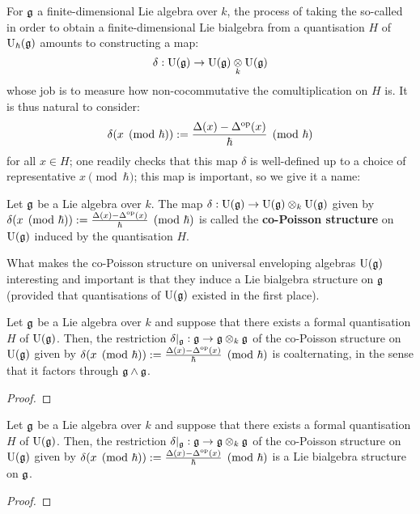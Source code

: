         For $\mathfrak{g}$ a finite-dimensional Lie algebra over $k$, the process of taking the so-called  in order to obtain a finite-dimensional Lie bialgebra from a quantisation $H$ of $\mathrm{U}_{\hbar}(\mathfrak{g})$ amounts to constructing a  map:
            $$\delta: \rmU(\g) \to \rmU(\g) \tensor_k \rmU(\g)$$
        whose job is to measure how non-cocommutative the comultiplication on $H$ is. It is thus natural to consider:
            $$\delta(x \pmod{\hbar}) := \frac{\Delta(x) - \Delta^{\mathrm{op}}(x)}{\hbar} \pmod{\hbar}$$
        for all $x \in H$; one readily checks that this map $\delta$ is well-defined up to a choice of representative $x \pmod{\hbar}$; this map is important, so we give it a name:
        \begin{definition} \label{def: co_poisson_structures}
            Let $\mathfrak{g}$ be a Lie algebra over $k$. The map $\delta: \rmU(\g) \to \rmU(\g) \tensor_k \rmU(\g)$ given by $\delta(x \pmod{\hbar}) := \frac{\Delta(x) - \Delta^{\mathrm{op}}(x)}{\hbar} \pmod{\hbar}$ is called the \textbf{co-Poisson structure} on $\mathrm{U}(\mathfrak{g})$ induced by the quantisation $H$.
        \end{definition}
        What makes the co-Poisson structure on universal enveloping algebras $\mathrm{U}(\mathfrak{g})$ interesting and important is that they induce a Lie bialgebra structure on $\mathfrak{g}$ (provided that quantisations of $\mathrm{U}(\mathfrak{g})$ existed in the first place). 
        \begin{lemma} \label{lemma: co_poisson_structures_are_coalternating}
            Let $\mathfrak{g}$ be a Lie algebra over $k$ and suppose that there exists a formal quantisation $H$ of $\mathrm{U}(\mathfrak{g})$. Then, the restriction $\delta|_{\g}: \g \to \g \tensor_k \g$ of the co-Poisson structure on $\mathrm{U}(\mathfrak{g})$ given by $\delta(x \pmod{\hbar}) := \frac{\Delta(x) - \Delta^{\mathrm{op}}(x)}{\hbar} \pmod{\hbar}$ is coalternating, in the sense that it factors through $\mathfrak{g} \wedge \mathfrak{g}$.
        \end{lemma}
            \begin{proof}
            
            \end{proof}
        \begin{theorem} \label{theorem: lie_bialgebra_structures_from_co_poisson_structures}
            Let $\mathfrak{g}$ be a Lie algebra over $k$ and suppose that there exists a formal quantisation $H$ of $\mathrm{U}(\mathfrak{g})$. Then, the restriction $\delta|_{\g}: \g \to \g \tensor_k \g$ of the co-Poisson structure on $\mathrm{U}(\mathfrak{g})$ given by $\delta(x \pmod{\hbar}) := \frac{\Delta(x) - \Delta^{\mathrm{op}}(x)}{\hbar} \pmod{\hbar}$ is a Lie bialgebra structure on $\mathfrak{g}$.    
        \end{theorem}
            \begin{proof}
                
            \end{proof}
    
